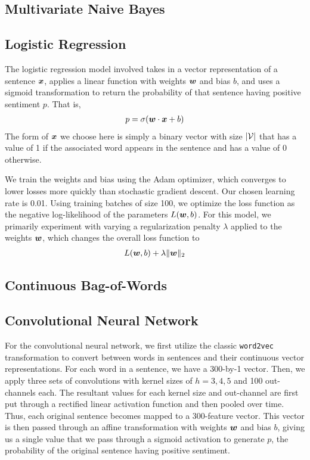 \documentclass[11pt]{article}
\begin{document}
\subsection{Multivariate Naive Bayes}

\subsection{Logistic Regression}
The logistic regression model involved takes in a vector representation of a sentence $\boldsymbol{x}$, applies a linear function with weights $\boldsymbol{w}$ and bias $b$, and uses a sigmoid transformation to return the probability of that sentence having positive sentiment $p$.  That is,
\begin{align*}
p = \sigma(\boldsymbol{w} \cdot \boldsymbol{x} + b)
\end{align*}
The form of $\boldsymbol{x}$ we choose here is simply a binary vector with size $\lvert \mathcal{V} \rvert$ that has a value of 1 if the associated word appears in the sentence and has a value of 0 otherwise.

We train the weights and bias using the Adam optimizer, which converges to lower losses more quickly than stochastic gradient descent.  Our chosen learning rate is 0.01.  Using training batches of size 100, we optimize the loss function as the negative log-likelihood of the parameters $L(\boldsymbol{w}, b)$.  For this model, we primarily experiment with varying a regularization penalty $\lambda$ applied to the weights $\boldsymbol{w}$, which changes the overall loss function to 
\begin{align*}
L(\boldsymbol{w}, b) + \lambda \| \boldsymbol{w} \|_2
\end{align*}

\subsection{Continuous Bag-of-Words}

\subsection{Convolutional Neural Network}
For the convolutional neural network, we first utilize the classic \texttt{word2vec} transformation to convert between words in sentences and their continuous vector representations.  For each word in a sentence, we have a 300-by-1 vector.  Then, we apply three sets of convolutions with kernel sizes of $h = 3, 4, 5$ and 100 out-channels each.  The resultant values for each kernel size and out-channel are first put through a rectified linear activation function and then pooled over time.  Thus, each original sentence becomes mapped to a 300-feature vector.  This vector is then passed through an affine transformation with weights $\boldsymbol{w}$ and bias $b$, giving us a single value that we pass through a sigmoid activation to generate $p$, the probability of the original sentence having positive sentiment.  
\end{document}
